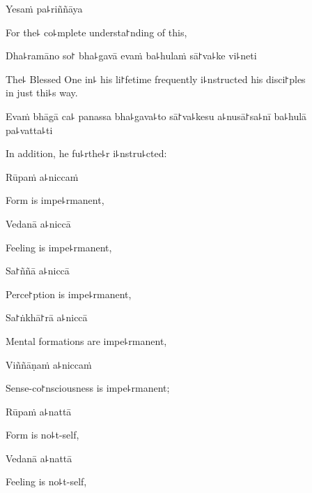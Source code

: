 Yesaṁ pa꜕riññāya

\begin{english}
  For the꜕ co꜕mplete understa꜓nding of this,
\end{english}

Dha꜕ramāno so꜓ bha꜕gavā evaṁ ba꜕hulaṁ sā꜓va꜕ke vi꜕neti

\begin{english}
  The꜕ Blessed One in꜕ his li꜓fetime frequently i꜕nstructed his disci꜓ples \\in just thi꜕s way.
\end{english}

Evaṁ bhāgā ca꜕ panassa bha꜕gava꜕to sā꜓va꜕kesu a꜕nusā꜓sa꜕nī ba꜕hulā pa꜕vatta꜕ti

\begin{english}
  In addition, he fu꜕rthe꜕r i꜕nstru꜕cted:
\end{english}


Rūpaṁ a꜕niccaṁ

\begin{english}
  Form is impe꜕rmanent,
\end{english}

Vedanā a꜕niccā

\begin{english}
  Feeling is impe꜕rmanent,
\end{english}

Sa꜓ññā a꜕niccā

\begin{english}
  Perce꜓ption is impe꜕rmanent,
\end{english}

Sa꜓ṅkhā꜓rā a꜕niccā

\begin{english}
  Mental formations are impe꜕rmanent,
\end{english}

Viññāṇaṁ a꜕niccaṁ

\begin{english}
  Sense-co꜓nsciousness is impe꜕rmanent;
\end{english}

Rūpaṁ a꜕nattā

\begin{english}
  Form is no꜕t-self,
\end{english}

Vedanā a꜕nattā

\begin{english}
  Feeling is no꜕t-self,
\end{english}

